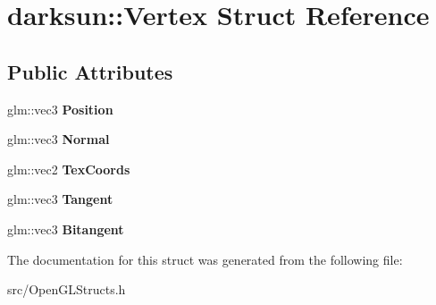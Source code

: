 \hypertarget{structdarksun_1_1_vertex}{}\section{darksun\+::Vertex Struct Reference}
\label{structdarksun_1_1_vertex}
\subsection*{Public Attributes}
\begin{DoxyCompactItemize}
\item 
\mbox{\label{structdarksun_1_1_vertex_a6f8d34f472258ff2e8952bfb80a754db}} 
glm\+::vec3 {\bfseries Position}
\item 
\mbox{\label{structdarksun_1_1_vertex_aeb7eff0f6c194f49450e144afb4419f5}} 
glm\+::vec3 {\bfseries Normal}
\item 
\mbox{\label{structdarksun_1_1_vertex_a81f6433ac4df7b4e2ebb5cb2bd249ee2}} 
glm\+::vec2 {\bfseries Tex\+Coords}
\item 
\mbox{\label{structdarksun_1_1_vertex_a20aa8fb41ff986b3068b238513fb77a8}} 
glm\+::vec3 {\bfseries Tangent}
\item 
\mbox{\label{structdarksun_1_1_vertex_a15c467308dcf7f7b0ccdc9bb05cba97a}} 
glm\+::vec3 {\bfseries Bitangent}
\end{DoxyCompactItemize}


The documentation for this struct was generated from the following file\+:\begin{DoxyCompactItemize}
\item 
src/Open\+G\+L\+Structs.\+h\end{DoxyCompactItemize}
